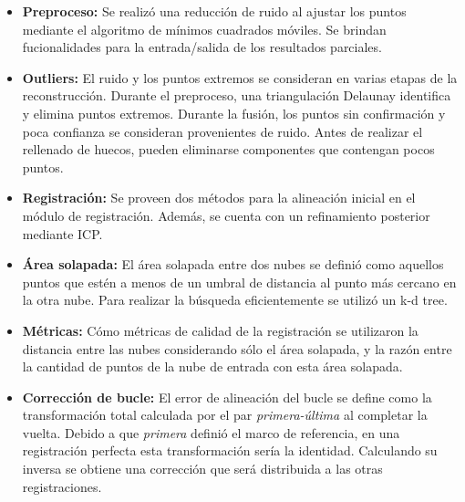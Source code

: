 \documentclass{pfc}
\newcommand{\NombreItem}[1]{{\bfseries#1:}}
\begin{document}
		\begin{itemize}
			\item  \NombreItem{Preproceso}
				Se realizó una reducción de ruido al ajustar los puntos
				mediante el algoritmo de mínimos cuadrados móviles.
				Se brindan fucionalidades para la entrada/salida de los resultados parciales.

			\item  \NombreItem{Outliers}
				El ruido y los puntos extremos se consideran en varias etapas de la reconstrucción. %
				Durante el preproceso, una triangulación Delaunay identifica y elimina puntos extremos.
				Durante la fusión, los puntos sin confirmación y %
                poca confianza
				se consideran provenientes de %
                ruido.
				Antes de realizar el rellenado de huecos, pueden eliminarse
				componentes que contengan pocos puntos.

			\item  \NombreItem{Registración}
				Se proveen dos métodos para la alineación inicial en el módulo de registración. %
				Además, se cuenta con un refinamiento posterior mediante ICP.

			\item  \NombreItem{Área solapada}
				El área solapada  entre dos nubes
				se definió como aquellos puntos que estén a menos de un umbral de distancia
				al punto más cercano en la otra nube.
				Para realizar la búsqueda eficientemente se utilizó un k-d tree.

			\item  \NombreItem{Métricas}
				Cómo métricas de calidad de la registración se utilizaron
				la distancia entre las nubes considerando sólo el área solapada,
				y la razón entre la cantidad de puntos de la nube de entrada con esta área solapada.

			\item  \NombreItem{Corrección de bucle}
				El error de alineación del bucle se define como la
				transformación total calculada por el par \emph{primera-última} %
				al completar la vuelta. 
Debido a que \emph{primera} definió el %
				marco de referencia, en una registración perfecta esta
				transformación sería la identidad.
				Calculando su inversa se obtiene una corrección que será distribuida
				a las otras registraciones.


\end{itemize}
\end{document}
